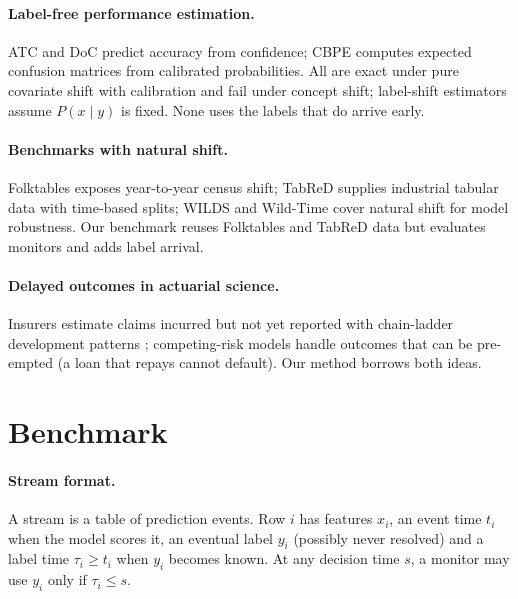 \documentclass[11pt]{article}
\begin{document}
\paragraph{Label-free performance estimation.} ATC \citep{garg2022atc} and DoC
\citep{guillory2021doc} predict accuracy from confidence; CBPE \citep{nannyml} computes expected
confusion matrices from calibrated probabilities. All are exact under pure covariate shift with
calibration and fail under concept shift; label-shift estimators \citep{lipton2018bbse} assume
$P(x \mid y)$ is fixed. None uses the labels that do arrive early.

\paragraph{Benchmarks with natural shift.} Folktables \citep{ding2021folktables} exposes
year-to-year census shift; TabReD \citep{rubachev2024tabred} supplies industrial tabular data with
time-based splits; WILDS and Wild-Time \citep{koh2021wilds,yao2022wildtime} cover natural shift
for model robustness. Our benchmark reuses Folktables and TabReD data but evaluates monitors and
adds label arrival.

\paragraph{Delayed outcomes in actuarial science.} Insurers estimate claims incurred but not
yet reported with chain-ladder development patterns \citep{mack1993chainladder}; competing-risk
models \citep{fine1999competing} handle outcomes that can be pre-empted (a loan that repays cannot
default). Our method borrows both ideas.

\section{Benchmark}\label{sec:benchmark}

\paragraph{Stream format.} A stream is a table of prediction events. Row $i$ has features
$x_i$, an event time $t_i$ when the model scores it, an eventual label $y_i$ (possibly never
resolved) and a label time $\tau_i \ge t_i$ when $y_i$ becomes known. At any decision time
$s$, a monitor may use $y_i$ only if $\tau_i \le s$.
\end{document}
